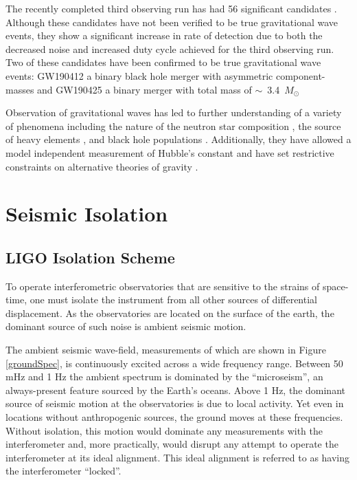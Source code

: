 \documentclass [12pt, proquest]{uwthesis}[2019]
\begin{document}
The recently completed third observing run has had 56 significant candidates \cite{O3events}. Although these candidates have not been verified to be true gravitational wave events, they show a significant increase in rate of detection due to both the decreased noise and increased duty cycle achieved for the third observing run. Two of these candidates have been confirmed to be true gravitational wave events: GW190412 \cite{GW190412} a binary black hole merger with asymmetric component-masses and GW190425 \cite{GW190425} a binary merger with total mass of $\sim$~3.4~$M_\odot$

Observation of gravitational waves has led to further understanding of a variety of phenomena including the nature of the neutron star composition \cite{NSEoS}, the source of heavy elements \cite{heavyElements}, and black hole populations \cite{GWTC}. Additionally, they have allowed a model independent measurement of Hubble's constant \cite{hubble1, hubble2} and have set restrictive constraints on alternative theories of gravity \cite{speedGW}.

\section{Seismic Isolation}\label{seisIso}

\subsection{LIGO Isolation Scheme}

To operate interferometric observatories that are sensitive to the strains of space-time, one must isolate the instrument from all other sources of differential displacement. As the observatories are located on the surface of the earth, the dominant source of such noise is ambient seismic motion. 

The ambient seismic wave-field, measurements of which are shown in Figure \ref{groundSpec}, is continuously excited across a wide frequency range. Between 50 mHz and 1 Hz the ambient spectrum is dominated by the ``microseism'', an always-present feature sourced by the Earth's oceans. Above 1 Hz, the dominant source of seismic motion at the observatories is due to local activity. Yet even in locations without anthropogenic sources, the ground moves at these frequencies. Without isolation, this motion would dominate any measurements with the interferometer and, more practically, would disrupt any attempt to operate the interferometer at its ideal alignment. This ideal alignment is referred to as having the interferometer ``locked''.
\end{document}
